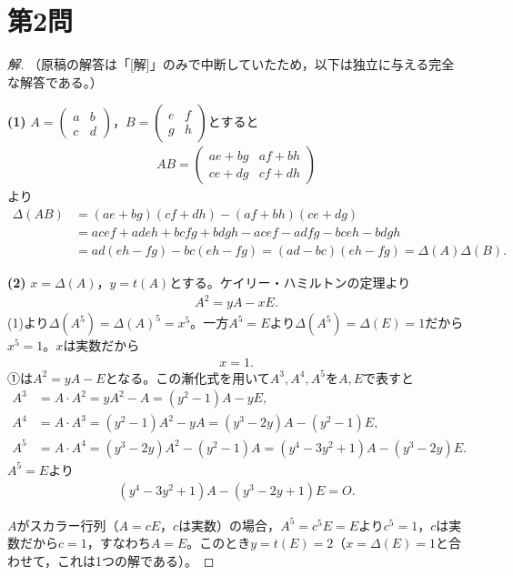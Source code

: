 \documentclass[../main.tex]{subfiles}
\begin{document}
\newpage

\section*{第2問}

\begin{proof}[解]
  （原稿の解答は「[解]」のみで中断していたため，以下は独立に与える完全な解答である。）

  \textbf{(1)} $A=
  \begin{pmatrix}a&b\\c&d
  \end{pmatrix}$，$B=
  \begin{pmatrix}e&f\\g&h
  \end{pmatrix}$とすると
  \begin{align*}
    AB=
    \begin{pmatrix}ae+bg&af+bh\\ce+dg&cf+dh
    \end{pmatrix}
  \end{align*}
  より
  \begin{align*}
    \Delta(AB)&=(ae+bg)(cf+dh)-(af+bh)(ce+dg)\\
    &=acef+adeh+bcfg+bdgh-acef-adfg-bceh-bdgh\\
    &=ad(eh-fg)-bc(eh-fg)=(ad-bc)(eh-fg)=\Delta(A)\Delta(B).
  \end{align*}

  \textbf{(2)} $x=\Delta(A)$，$y=t(A)$とする。ケイリー・ハミルトンの定理より
  \begin{align*}
    A^2=yA-xE.\tag{①}
  \end{align*}
  (1)より$\Delta(A^5)=\Delta(A)^5=x^5$。一方$A^5=E$より$\Delta(A^5)=\Delta(E)=1$だから$x^5=1$。$x$は実数だから
  \begin{align*}
    x=1.
  \end{align*}
  ①は$A^2=yA-E$となる。この漸化式を用いて$A^3,A^4,A^5$を$A,E$で表すと
  \begin{align*}
    A^3&=A\cdot A^2=y A^2-A=(y^2-1)A-yE,\\
    A^4&=A\cdot A^3=(y^2-1)A^2-yA=(y^3-2y)A-(y^2-1)E,\\
    A^5&=A\cdot A^4=(y^3-2y)A^2-(y^2-1)A=(y^4-3y^2+1)A-(y^3-2y)E.
  \end{align*}
  $A^5=E$より
  \begin{align*}
    (y^4-3y^2+1)A-(y^3-2y+1)E=O.\tag{②}
  \end{align*}

  $A$がスカラー行列（$A=cE$，$c$は実数）の場合，$A^5=c^5E=E$より$c^5=1$，$c$は実数だから$c=1$，すなわち$A=E$。このとき$y=t(E)=2$（$x=\Delta(E)=1$と合わせて，これは1つの解である）。


\end{proof}
\end{document}
